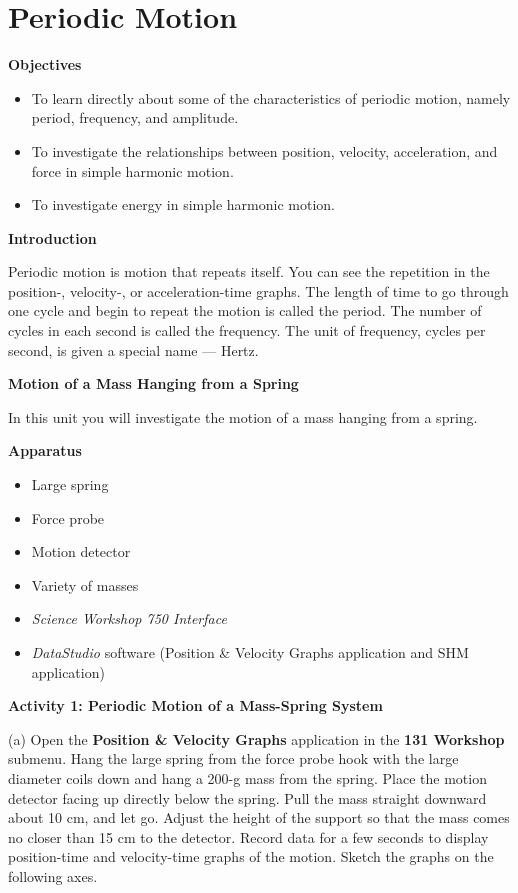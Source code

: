\section{Periodic Motion}

\makelabheader %

{\bf Objectives }

\begin{itemize}
\item To learn directly about some of the characteristics of periodic motion, namely period, frequency, and amplitude. 
\item To investigate the relationships between position, velocity, acceleration, and force in simple harmonic motion. 
\item To investigate energy in simple harmonic motion.
\end{itemize}
\textbf{Introduction }

Periodic motion is motion that repeats itself. You can see the repetition in
the position-, velocity-, or acceleration-time graphs. The length of time to
go through one cycle and begin to repeat the motion is called the period. The
number of cycles in each second is called the frequency. The unit of frequency,
cycles per second, is given a special name --- Hertz.

\textbf{Motion of a Mass Hanging from a Spring} 

In this unit you will investigate the motion of a mass hanging from a spring.

\textbf{Apparatus} 

\begin{itemize}
\item Large spring 
\item Force probe 
\item Motion detector 
\item Variety of masses 
\item \textit{Science Workshop 750 Interface}
\item \textit{DataStudio} software (Position \& Velocity Graphs application and SHM
application)
\end{itemize}
\textbf{Activity 1: Periodic Motion of a Mass-Spring System} 

(a) Open the \textbf{Position \& Velocity Graphs} application in the \textbf{131 Workshop} submenu. Hang the large spring from the force probe hook with the
large diameter coils down and hang a 200-g mass from the spring. Place the motion detector facing up directly below the spring. Pull the mass straight downward about 10 cm, and let go. 
Adjust the height of the support so that the mass comes no closer than 15 cm 
to the detector. Record data for a few seconds to display position-time and 
velocity-time graphs of the motion. Sketch the graphs on the following axes.

